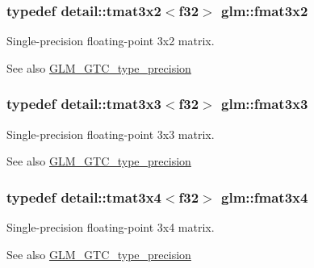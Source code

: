 \subsubsection[{fmat3x2}]{\setlength{\rightskip}{0pt plus 5cm}typedef detail\+::tmat3x2$<$f32$>$ {\bf glm\+::fmat3x2}}\label{group__gtc__type__precision_ga8df314d9c425c283d4cec4047b8cf1f6}
Single-\/precision floating-\/point 3x2 matrix. \begin{DoxySeeAlso}{See also}
\hyperlink{group__gtc__type__precision}{G\+L\+M\+\_\+\+G\+T\+C\+\_\+type\+\_\+precision} 
\end{DoxySeeAlso}
\hypertarget{group__gtc__type__precision_gab6848d63c51579e333fa69d335d2664a}{}
\subsubsection[{fmat3x3}]{\setlength{\rightskip}{0pt plus 5cm}typedef detail\+::tmat3x3$<$f32$>$ {\bf glm\+::fmat3x3}}\label{group__gtc__type__precision_gab6848d63c51579e333fa69d335d2664a}
Single-\/precision floating-\/point 3x3 matrix. \begin{DoxySeeAlso}{See also}
\hyperlink{group__gtc__type__precision}{G\+L\+M\+\_\+\+G\+T\+C\+\_\+type\+\_\+precision} 
\end{DoxySeeAlso}
\hypertarget{group__gtc__type__precision_ga25970f79d7650ec2d422119fe1e56c3f}{}
\subsubsection[{fmat3x4}]{\setlength{\rightskip}{0pt plus 5cm}typedef detail\+::tmat3x4$<$f32$>$ {\bf glm\+::fmat3x4}}\label{group__gtc__type__precision_ga25970f79d7650ec2d422119fe1e56c3f}
Single-\/precision floating-\/point 3x4 matrix. \begin{DoxySeeAlso}{See also}
\hyperlink{group__gtc__type__precision}{G\+L\+M\+\_\+\+G\+T\+C\+\_\+type\+\_\+precision} 
\end{DoxySeeAlso}
\hypertarget{group__gtc__type__precision_ga055416da4fe01f31008a03b52a80d174}{}
